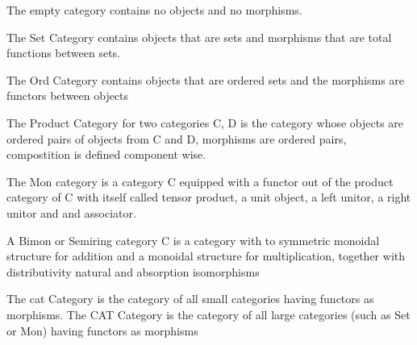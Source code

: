        
        \begin{example}
         The empty category contains no objects and no morphisms. 
         
         The Set Category contains objects that are sets and morphisms that are total functions between sets. 
         
        The Ord Category contains objects that are ordered sets and the morphisms are functors between objects
         
         The Product Category for two categories C, D is the category whose objects are ordered pairs of objects from C and D, morphisms are ordered pairs, compostition is defined component wise. 
         
         The Mon category is a category C equipped with a functor out of the product category of C with itself called tensor product, a unit object, a left unitor, a right unitor and and associator. 
         
         A Bimon or Semiring category C is a category with to symmetric monoidal structure for addition and a monoidal structure for multiplication, together with distributivity natural and absorption isomorphisms
         
         The cat Category is the category of all small categories having functors as morphisms. The CAT Category is the category of all large categories (such as Set or Mon) having functors as morphisms
        \end{example}
